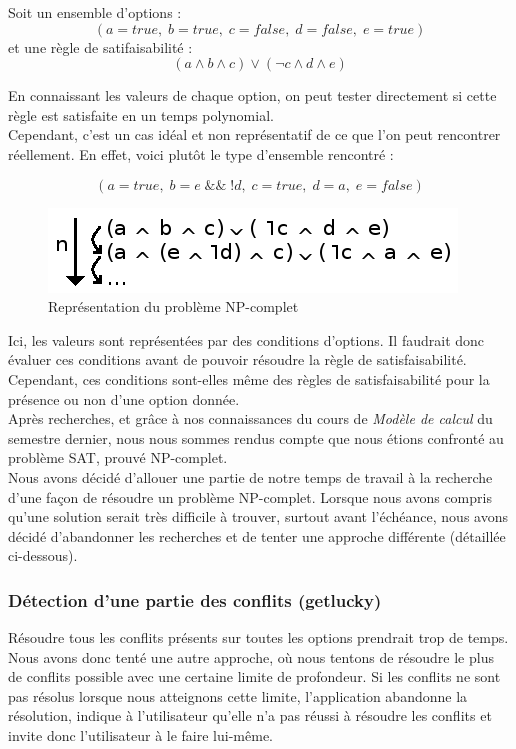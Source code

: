 \documentclass[17pts]{report}
\begin{document}
Soit un ensemble d'options :
\begin{equation}
    (a = true,\; b = true,\; c = false,\; d = false,\; e = true)
\end{equation}
et une règle de satifaisabilité :
\begin{equation}
(a \land b \land c) \lor (\lnot c \land d \land e)
\end{equation}

En connaissant les valeurs de chaque option, on peut tester directement si cette
règle est satisfaite en un temps polynomial.\\
Cependant, c'est un cas idéal et non représentatif de ce que l'on
peut rencontrer réellement. En effet, voici plutôt le type d'ensemble rencontré :

\begin{equation}
(a = true,\; b = e \;\&\&\; !d,\; c = true,\; d = a,\; e = false)
\end{equation}

\begin{figure}[H]
    \includegraphics[scale=1]{./illustrations/np_complet.png}
    \centering
    \caption{Représentation du problème NP-complet}
    \label{fig:NP-complet}
\end{figure}

Ici, les valeurs sont représentées par des conditions d'options. Il faudrait
donc évaluer ces conditions avant de pouvoir résoudre la règle de
satisfaisabilité. Cependant, ces conditions sont-elles même des règles de
satisfaisabilité pour la présence ou non d'une option donnée. \\ Après
recherches, et grâce à nos connaissances du cours de \textit{Modèle de calcul}
du semestre dernier, nous nous sommes rendus compte que nous étions confronté
au problème SAT, prouvé NP-complet.\\

Nous avons décidé d'allouer une partie de notre temps de travail à la recherche
d'une façon de résoudre un problème NP-complet. Lorsque nous avons compris
qu'une solution serait très difficile à trouver, surtout avant l'échéance, nous
avons décidé d'abandonner les recherches et de tenter une approche différente
(détaillée ci-dessous).

\subsubsection{Détection d'une partie des conflits (getlucky)}
\label{ssub:Problème NP-Complet (getlucky)}
Résoudre tous les conflits présents sur toutes les options prendrait trop de
temps.  Nous avons donc tenté une autre approche, où nous tentons de résoudre
le plus de conflits possible avec une certaine limite de profondeur. Si les
conflits ne sont pas résolus lorsque nous atteignons cette limite,
l'application abandonne la résolution, indique à l'utilisateur qu'elle n'a
pas réussi à résoudre les conflits et invite donc l'utilisateur à le faire
lui-même.\\
\end{document}
